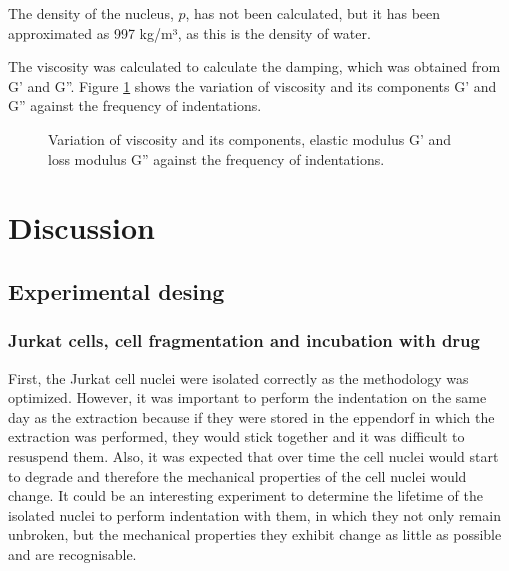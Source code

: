\documentclass[12pt, a4paper]{article} %
\begin{document}
\setlength{\parskip}{4mm}

The density of the nucleus, $p$, has not been calculated, but it has been approximated as 997 kg/m³, as this is the density of water.

The viscosity was calculated to calculate the damping, which was obtained from G' and G''. Figure \ref{fig:vicosidad} shows the variation of viscosity and its components G' and G'' against the frequency of indentations.

\begin{figure}[H]
	\centering
	
	\caption{Variation of viscosity and its components, elastic modulus G' and loss modulus G'' against the frequency of indentations.}
	\label{fig:vicosidad}
\end{figure}

\newpage

\setlength{\parskip}{0mm}


\section{Discussion}

\subsection{Experimental desing}

\subsubsection{Jurkat cells, cell fragmentation and incubation with drug}

First, the Jurkat cell nuclei were isolated correctly as the methodology was optimized. However, it was important to perform the indentation on the same day as the extraction because if they were stored in the eppendorf in which the extraction was performed, they would stick together and it was difficult to resuspend them. Also, it was expected that over time the cell nuclei would start to degrade and therefore the mechanical properties of the cell nuclei would change. It could be an interesting experiment to determine the lifetime of the isolated nuclei to perform indentation with them, in which they not only remain unbroken, but the mechanical properties they exhibit change as little as possible and are recognisable.
\end{document}
